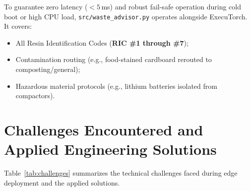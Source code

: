 \documentclass[12pt,a4paper]{article}
\begin{document}
To guarantee zero latency ($<5$\,ms) and robust fail-safe operation during cold boot or high
CPU load, \texttt{src/waste\_advisor.py} operates alongside ExecuTorch. It covers:
\begin{itemize}[noitemsep]
  \item All Resin Identification Codes (\textbf{RIC \#1 through \#7});
  \item Contamination routing (e.g., food-stained cardboard rerouted to composting/general);
  \item Hazardous material protocols (e.g., lithium batteries isolated from compactors).
\end{itemize}

\clearpage

\section{Challenges Encountered and Applied Engineering Solutions}

Table~\ref{tab:challenges} summarizes the technical challenges faced during edge deployment and
the applied solutions.
\end{document}
